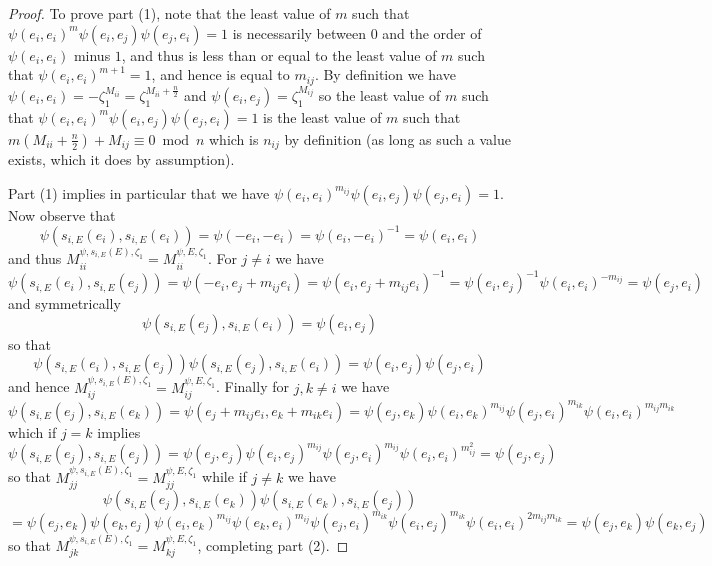 \documentclass[11pt,letterpaper]{article}
\theoremstyle{definition}
\theoremstyle{remark}
\numberwithin{equation}{section}
\theoremstyle{dotless}
\newcommand{\hchi}{\psi} %
\newcommand{\gene}{\zeta_1} %
\begin{document}
\begin{proof} To prove part (1), note that the least value of $m$ such that $\hchi(e_i,e_i)^m \hchi(e_i,e_j) \hchi(e_j,e_i) =1$ is necessarily between $0$ and the order of $\hchi(e_i,e_i)$ minus $1$, and thus is less than or equal to the least value of $m$ such that $\hchi(e_i,e_i)^{m+1}=1$, and hence is equal to $m_{ij}$. By definition we have $ \hchi(e_i,e_i) = - \gene^{M_{ii}} = \gene^{ M_{ii}+\frac{n}{2}} $ and $\hchi(e_i,e_j) = \gene^{M_{ij}}$ so the least value of $m$ such that $\hchi(e_i,e_i)^m \hchi(e_i,e_j) \hchi(e_j,e_i) =1$  is the least value of $m$ such that $m ( M_{ii} + \frac{n}{2}) + M_{ij} \equiv 0 \bmod n$ which is $n_{ij}$ by definition (as long as such a value exists, which it does by assumption).

Part (1) implies in particular that we have $\hchi(e_i,e_i)^{m_{ij}} \hchi(e_i,e_j) \hchi(e_j,e_i) =1$. Now observe that
\begin{equation}\label{bi-ii} \hchi( s_{i,E}(e_i), s_{i,E} (e_i)) =\hchi( -e_i,-e_i)=\hchi(e_i,-e_i)^{-1} = \hchi(e_i,e_i) \end{equation} and thus $M_{ii}^{\hchi,s_{i,E}(E) , \gene}=M_{ii}^{\hchi,E, \gene}$.
For $j \neq i$ we have
\[ \hchi( s_{i,E}(e_i), s_{i,E} (e_j))= \hchi(-e_i, e_j + m_{ij}e_i)= \hchi(e_i,e_j+m_{ij} e_i)^{-1} = \hchi(e_i,e_j)^{-1} \hchi(e_i,e_i)^{- m_{ij}} = \hchi(e_j,e_i)\]
and symmetrically
\[ \hchi( s_{i,E}(e_j), s_{i,E} (e_i)) = \hchi(e_i,e_j) \]
so that
\[ \hchi( s_{i,E}(e_i), s_{i,E} (e_j)) \hchi( s_{i,E}(e_j), s_{i,E} (e_i))=  \hchi(e_i,e_j)\hchi(e_j,e_i)\]
and hence $M_{ij}^{\hchi,s_{i,E}(E) , \gene}=M_{ij}^{\hchi,E, \gene}$. Finally for $j,k \neq i$ we have
\[ \hchi( s_{i,E}(e_j), s_{i,E} (e_k))=\hchi(e_j + m_{ij}e_i,e_k + m_{ik}e_i) = \hchi(e_j,e_k) \hchi(e_i,e_k)^{m_{ij} }  \hchi(e_j,e_i)^{m_{ik}} \hchi(e_i,e_i)^{m_{ij}m_{ik}}  \]
which if $j=k$ implies
\[  \hchi( s_{i,E}(e_j), s_{i,E} (e_j)) =\hchi(e_j,e_j) \hchi(e_i,e_j)^{m_{ij} }\hchi(e_j,e_i)^{m_{ij}} \hchi(e_i,e_i)^{m_{ij}^2} = \hchi(e_j,e_j) \]
so that $M_{jj}^{\hchi,s_{i,E}(E) , \gene}=M_{jj}^{\hchi,E, \gene}$ while if $j \neq k$ we have
\[ \hchi( s_{i,E}(e_j), s_{i,E} (e_k))\hchi( s_{i,E}(e_k), s_{i,E} (e_j))\] \[=\hchi(e_j,e_k)  \hchi(e_k,e_j) \hchi(e_i,e_k)^{m_{ij} }  \hchi(e_k,e_i)^{m_{ij} } \hchi(e_j,e_i)^{m_{ik}} \hchi(e_i,e_j)^{m_{ik} }\hchi(e_i,e_i)^{2m_{ij}m_{ik}} = \hchi(e_j,e_k)  \hchi(e_k,e_j)\]
so that $M_{jk}^{\hchi,s_{i,E}(E) , \gene}=M_{kj}^{\hchi,E, \gene}$, completing part (2). \end{proof}
\end{document}
